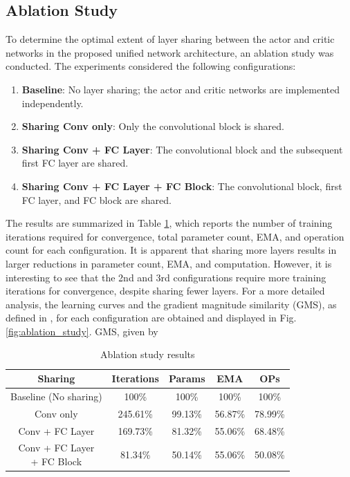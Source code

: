 \subsection{Ablation Study}

To determine the optimal extent of layer sharing between the actor and critic networks in the proposed unified network architecture, an ablation study was conducted. The experiments considered the following configurations:
 \begin{enumerate}
    \item \textbf{Baseline}: No layer sharing; the actor and critic networks are implemented independently.
    \item \textbf{Sharing Conv only}: Only the convolutional block is shared.
    \item \textbf{Sharing Conv + FC Layer}: The convolutional block and the subsequent first FC layer are shared.
    \item \textbf{Sharing Conv + FC Layer + FC Block}: The convolutional block, first FC layer, and FC block are shared.
\end{enumerate}

The results are summarized in Table \ref{tab:comp}, which reports the number of training iterations required for convergence, total parameter count, EMA, and operation count for each configuration. It is apparent that sharing more layers results in larger reductions in parameter count, EMA, and computation. However, it is interesting to see that the 2nd and 3rd configurations require more training iterations for convergence, despite sharing fewer layers. For a more detailed analysis, the learning curves and the gradient magnitude similarity (GMS), as defined in \cite{GMS}, for each configuration are obtained and displayed in Fig. \ref{fig:ablation_study}. GMS, given by

\begin{table}[t]
    \centering
    \caption{Ablation study results}
    \label{tab:comp}
    \vspace{0.1cm}
    \begin{tabular}{|c|c|c|c|c|}
        \hline
        \textbf{Sharing}             & \textbf{Iterations}   & \textbf{Params}   & \textbf{EMA}     & \textbf{OPs}     \\
        \hline
        Baseline (No sharing)          & 100\%   & 100\%    & 100\%   & 100\%   \\
        \hline Conv only  & 245.61\%& 99.13\%  & 56.87\% & 78.99\% \\
        \hline Conv + FC Layer  & 169.73\%& 81.32\%  & 55.06\% & 68.48\% \\
        \hline \makecell{Conv + FC Layer \\ + FC Block}      & 81.34\% & 50.14\%  & 55.06\% & 50.08\% \\
        \hline
    \end{tabular}
    \vspace{-0.2cm}
\end{table}

